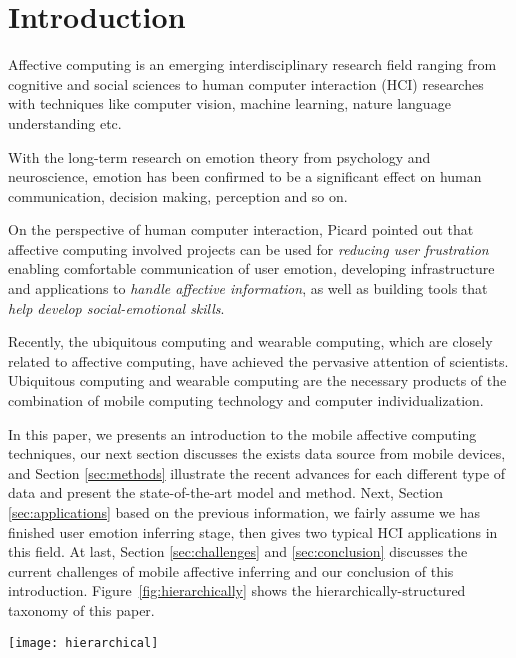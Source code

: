 \section{Introduction}\label{sec:intro}

Affective computing is an emerging interdisciplinary research field ranging from cognitive and social sciences to human computer interaction (HCI) researches with techniques like computer vision, machine learning, nature language understanding etc.

With the long-term research on emotion theory from psychology and neuroscience\cite{james1884emotion, turkle2005second}, emotion has been confirmed to be a significant effect \cite{james2013emotion} on human communication, decision making, perception and so on.

On the perspective of human computer interaction, Picard \cite{Picard1999} pointed out that affective computing involved projects can be used for \emph{reducing user frustration} enabling comfortable communication of user emotion, developing infrastructure and applications to \emph{handle affective information}, as well as building tools that \emph{help develop social-emotional skills}.

Recently, the ubiquitous computing and wearable computing, which are closely related to affective computing, have achieved the pervasive attention of scientists. Ubiquitous computing and wearable computing are the necessary products of the combination of mobile computing technology and computer individualization.

In this paper, we presents an introduction to the mobile affective computing techniques, our next section discusses the exists data source from mobile devices, and Section \ref{sec:methods} illustrate the recent advances for each different type of data and present the state-of-the-art model and method. Next, Section \ref{sec:applications} based on the previous information, we fairly assume we has finished user emotion inferring stage, then gives two typical HCI applications in this field. At last, Section \ref{sec:challenges} and \ref{sec:conclusion} discusses the current challenges of mobile affective inferring and our conclusion of this introduction.
Figure~\ref{fig:hierarchically} shows the hierarchically-structured taxonomy of this paper.

\begin{figure*}[htb]
    \centering
    \texttt{[image: hierarchical]}
    \caption{Hierarchically-structured taxonomy of this paper.}
    \label{fig:hierarchically}
\end{figure*}